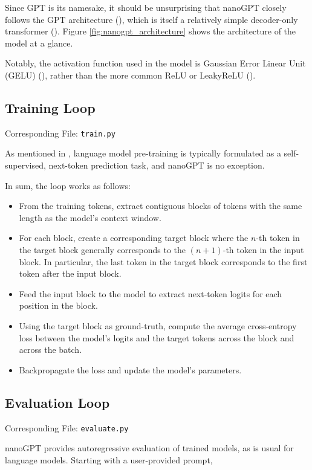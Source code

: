 \documentclass{article} %
\theoremstyle{definition}
\begin{document}
Since GPT is its namesake, it should be unsurprising that nanoGPT closely follows 
the GPT architecture (\cite{radford-et-al-2019}), which is itself 
a relatively simple decoder-only transformer (\cite{vaswani-et-al-2017}).
Figure \ref{fig:nanogpt_architecture} shows the architecture of the model at a glance.

Notably, the activation function used in the model is Gaussian Error Linear Unit (GELU) (\cite{gelu}),
rather than the more common ReLU or LeakyReLU (\cite{xu-et-al-2015, relu}).


\subsection{Training Loop}
Corresponding File: \texttt{train.py}

As mentioned in \cite{beh-2025}, language model pre-training
is typically formulated as a self-supervised, next-token prediction task,
and nanoGPT is no exception.

In sum, the loop works as follows:
\begin{itemize}
    \item From the training tokens, extract contiguous blocks of tokens
        with the same length as the model's context window.
    \item For each block, create a corresponding target block
        where the $n$-th token in the target block generally corresponds 
        to the $(n+1)$-th token in the input block. 
        In particular, the last token in the target block corresponds 
        to the first token after the input block.
    \item Feed the input block to the model to extract next-token logits
        for each position in the block.
    \item Using the target block as ground-truth, compute the average cross-entropy loss
        between the model's logits and the target tokens across the block and across the batch.
    \item Backpropagate the loss and update the model's parameters.
\end{itemize}

\subsection{Evaluation Loop}
Corresponding File: \texttt{evaluate.py}

nanoGPT provides autoregressive evaluation of trained models, as is usual
for language models. Starting with a user-provided prompt,
\end{document}
